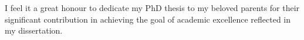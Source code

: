 I feel it a great honour to dedicate my PhD thesis to my beloved parents for their significant contribution in achieving the goal of academic excellence reflected in my dissertation.
